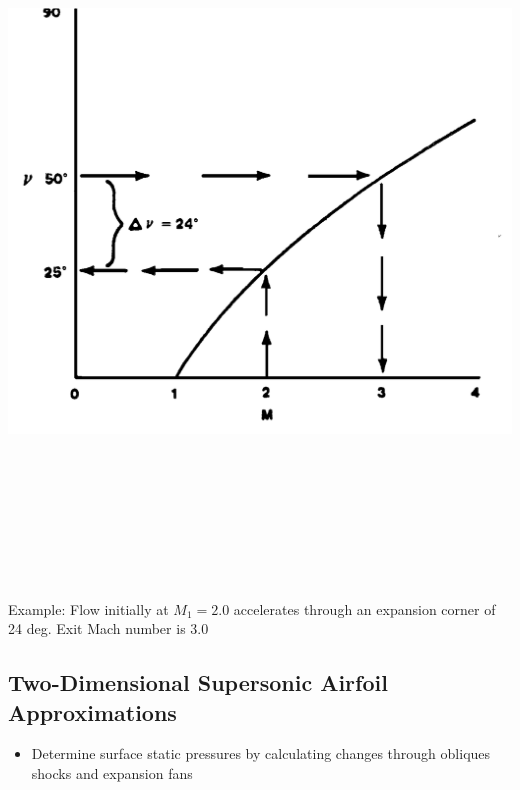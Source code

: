 \documentclass[
]{book}
\providecommand{\tightlist}{%
  \setlength{\itemsep}{0pt}\setlength{\parskip}{0pt}}
\begin{document}
\includegraphics[width=8.8in,height=7.5in]{media/05/image66.svg}

Example: Flow initially at \(M_1 = 2.0\) accelerates through an expansion corner of 24 deg. Exit Mach number is 3.0

\hypertarget{two-dimensional-supersonic-airfoil-approximations}{%
\subsection{Two-Dimensional Supersonic Airfoil Approximations}\label{two-dimensional-supersonic-airfoil-approximations}}

\begin{itemize}
\tightlist
\item
  Determine surface static pressures by calculating changes through obliques shocks and expansion fans
\end{itemize}
\end{document}
